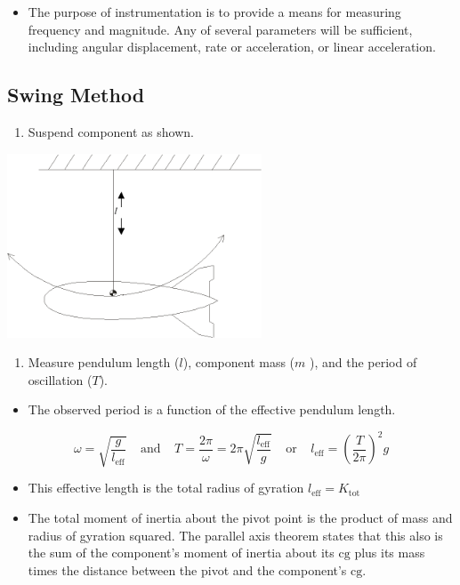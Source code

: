 \documentclass[
]{book}
\providecommand{\tightlist}{%
  \setlength{\itemsep}{0pt}\setlength{\parskip}{0pt}}
\begin{document}
\begin{itemize}
\tightlist
\item
  The purpose of instrumentation is to provide a means for measuring frequency and magnitude. Any of several parameters will be sufficient, including angular displacement, rate or acceleration, or linear acceleration.
\end{itemize}

\hypertarget{swing-method}{%
\subsection{Swing Method}\label{swing-method}}

\begin{enumerate}
\def\labelenumi{\arabic{enumi}.}
\tightlist
\item
  Suspend component as shown.
\end{enumerate}

\includegraphics[width=2.98264in,height=2.15625in]{media/07/image54.png}~

\begin{enumerate}
\def\labelenumi{\arabic{enumi}.}
\setcounter{enumi}{1}
\tightlist
\item
  Measure pendulum length (\(l\)), component mass (\(m\) ), and the period of oscillation (\(T\)).
\end{enumerate}

\begin{itemize}
\tightlist
\item
  The observed period is a function of the effective pendulum length.
\end{itemize}

\[ \omega = \sqrt{\frac{g}{l_{\mathrm{eff}}}} \;\;\;\;\text{and}\;\;\;\; T = \frac{2 \pi}{\omega} = 2 \pi \sqrt{\frac{l_{\mathrm{eff}}}{g}} \;\;\;\;\text{or}\;\;\;\; l_{\mathrm{eff}} = \left( \frac{T}{2 \pi} \right)^2 g \]

\begin{itemize}
\tightlist
\item
  This effective length is the total radius of gyration \(l_{\mathrm{eff}} = K_{\mathrm{tot}}\)
\item
  The total moment of inertia about the pivot point is the product of mass and radius of gyration squared. The parallel axis theorem states that this also is the sum of the component's moment of inertia about its \(\mathrm{cg}\) plus its mass times the distance between the pivot and the component's \(\mathrm{cg}\).
\end{itemize}
\end{document}
